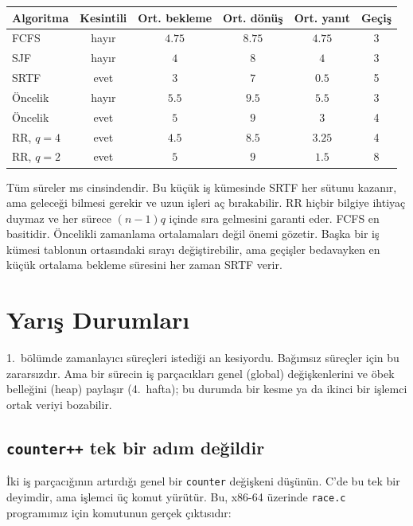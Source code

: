 \begin{center}
\renewcommand{\arraystretch}{1.2}
\begin{tabular}{@{}lccccc@{}}
\toprule
\textbf{Algoritma} & \textbf{Kesintili} & \textbf{Ort. bekleme} & \textbf{Ort. dönüş} & \textbf{Ort. yanıt} & \textbf{Geçiş}\\
\midrule
FCFS & hayır & $4.75$ & $8.75$ & $4.75$ & 3\\
SJF & hayır & $4$ & $8$ & $4$ & 3\\
SRTF & evet & $3$ & $7$ & $0.5$ & 5\\
Öncelik & hayır & $5.5$ & $9.5$ & $5.5$ & 3\\
Öncelik & evet & $5$ & $9$ & $3$ & 4\\
RR, $q = 4$ & evet & $4.5$ & $8.5$ & $3.25$ & 4\\
RR, $q = 2$ & evet & $5$ & $9$ & $1.5$ & 8\\
\bottomrule
\end{tabular}
\end{center}

Tüm süreler ms cinsindendir. Bu küçük iş kümesinde SRTF her sütunu kazanır, ama geleceği bilmesi gerekir ve uzun işleri aç bırakabilir. RR hiçbir bilgiye ihtiyaç duymaz ve her sürece $(n-1)q$ içinde sıra gelmesini garanti eder. FCFS en basitidir. Öncelikli zamanlama ortalamaları değil önemi gözetir. Başka bir iş kümesi tablonun ortasındaki sırayı değiştirebilir, ama geçişler bedavayken en küçük ortalama bekleme süresini her zaman SRTF verir.

\section{Yarış Durumları}

1.~bölümde zamanlayıcı süreçleri istediği an kesiyordu. Bağımsız süreçler için bu zararsızdır. Ama bir sürecin iş parçacıkları genel (global) değişkenlerini ve öbek belleğini (heap) paylaşır (4.~hafta); bu durumda bir kesme ya da ikinci bir işlemci ortak veriyi bozabilir.

\subsection{\texttt{counter++} tek bir adım değildir}

İki iş parçacığının artırdığı genel bir \texttt{counter} değişkeni düşünün. C'de bu tek bir deyimdir, ama işlemci üç komut yürütür. Bu, x86-64 üzerinde \texttt{race.c} programımız için  komutunun gerçek çıktısıdır:

